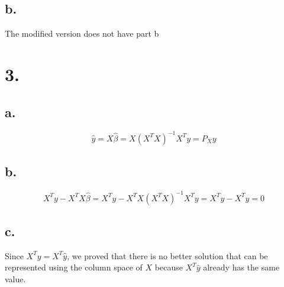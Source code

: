 \documentclass[11pt]{article}
\theoremstyle{mystyle}
\theoremstyle{definition}
\begin{document}
\subsection*{b.}
The modified version does not have part b 
\pagebreak
\section*{3.}
\subsection*{a.}
\[
  \hat y = X \hat \beta = X (X^T X)^{-1} X^T y = P_X y
\]
\subsection*{b.}
\[
  X^T y - X^T X \hat \beta = X^T y - X^T X (X^T X)^{-1} X^T y = X^Ty - X^Ty = 0 
\]
\subsection*{c.}
Since $X^T y = X^T \hat y$, we proved that there is no better solution that can be represented using the column space of $X$ because $X^T \hat y$ already has the same value.
\end{document}
